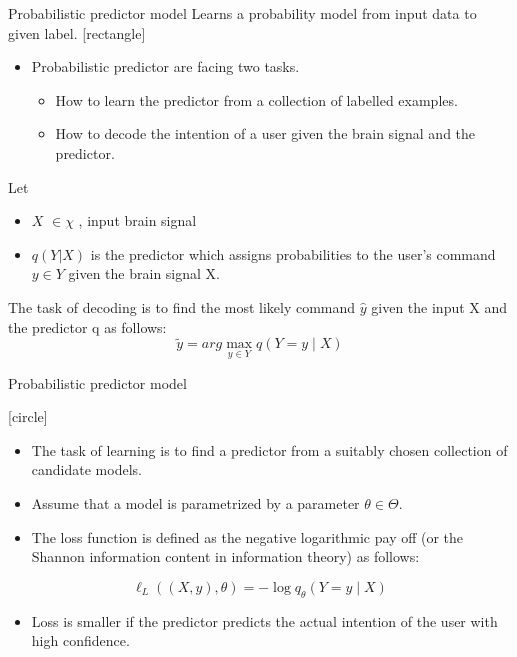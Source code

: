 \documentclass[11pt]{beamer}
\begin{document}
\begin{frame}{Probabilistic predictor model}
Learns a probability model from input data to given label.\vspace{.1in}
[rectangle] 
 \begin{itemize}
     \item Probabilistic predictor are facing two tasks.
     \begin{itemize}
[default] 
      \item How to learn the predictor from a collection of labelled examples.
      \item How to decode the intention of a user given the brain signal and the predictor.
      \end{itemize}
        \end{itemize}
        Let 
        \begin{itemize}
        [circle]
         \item  $X$ $\in \chi$ , input brain signal 
         \item      $q\left(Y\vert X\right)$ is the predictor which assigns probabilities to the user's command  $y\in Y$ given the brain signal X.
             \end{itemize}
             \vspace{.1in}
            The task of decoding is to find the most likely command  $\hat{y}$ given the input X and the predictor q as follows:
            \[
  \tilde{y}=arg\max_{y\in Y} q\left(Y=y\mid X\right)
\]
\end{frame}
\begin{frame}{Probabilistic predictor model}

[circle] 
 \begin{itemize}
    \item The task of learning is to find a predictor from a suitably chosen collection of candidate models.

    \item Assume that a model is parametrized by a parameter $\theta \in \Theta$.

    \item The loss function is defined as the negative logarithmic pay off (or the Shannon information content in information theory) as follows:
             \end{itemize}       
            \[
  \ell_L\left(\left(X,y\right),\theta\right)=-\log q_\theta\left(Y=y\mid X\right)
\]
 \begin{itemize}
    \item Loss is smaller if the predictor predicts the actual intention of the user with high confidence.
    \end{itemize}  
\end{frame}
\end{document}
